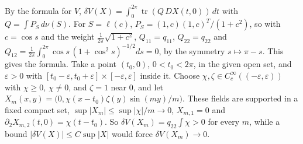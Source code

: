 \begin{solution}
By the formula for $V$, $\delta V(X) = \int_0^{2\pi}\operatorname{tr}(Q\,DX(t, 0))\,dt$ with $Q = \int P_S\,d\nu(S)$. For $S = \ell(c)$, $P_S = (1, c)(1, c)^T/(1 + c^2)$, so with $c = \cos s$ and the weight
$\frac1{2\pi}\sqrt{1 + c^2}$, $Q_{11} = q_{11}$, $Q_{22} = q_{22}$ and $Q_{12} = \frac1{2\pi}\int_0^{2\pi}\cos s\,(1 + \cos^2s)^{-1/2}ds = 0$, by the symmetry $s \mapsto \pi - s$. This gives the formula. Take a
point $(t_0, 0)$, $0 < t_0 < 2\pi$, in the given open set, and $\varepsilon > 0$ with $[t_0 - \varepsilon, t_0 + \varepsilon] \times [-\varepsilon, \varepsilon]$ inside it. Choose $\chi, \zeta \in C^\infty_c((-\varepsilon, \varepsilon))$
with $\chi \geq 0$, $\chi \neq 0$, and $\zeta = 1$ near $0$, and let $X_m(x, y) = \bigl(0, \chi(x - t_0)\zeta(y)\sin(my)/m\bigr)$. These fields are supported in a fixed compact set, $\sup|X_m| \leq \sup|\chi|/m \to 0$,
$X_{m,1} = 0$ and $\partial_2X_{m,2}(t, 0) = \chi(t - t_0)$. So $\delta V(X_m) = q_{22}\int\chi > 0$ for every $m$, while a bound $|\delta V(X)| \leq C\sup|X|$ would force $\delta V(X_m) \to 0$.
\end{solution}
